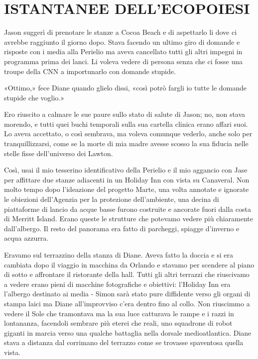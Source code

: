 \chapter{ISTANTANEE DELL'ECOPOIESI}\label{istantanee-dell-ecopoiesi}

\hfill\break

Jason suggerì di prenotare le stanze a Cocoa Beach e di aspettarlo li
dove ci avrebbe raggiunto il giorno dopo. Stava facendo un ultimo giro
di domande e risposte con i media alla Perielio ma aveva cancellato
tutti gli altri impegni in programma prima dei lanci. Li voleva vedere
di persona senza che ci fosse una troupe della CNN a importunarlo con
domande stupide.

«Ottimo,» fece Diane quando glielo dissi, «così potrò fargli io tutte le
domande stupide che voglio.»

Ero riuscito a calmare le sue paure sullo stato di salute di Jason; no,
non stava morendo, e tutti quei buchi temporali sulla sua cartella
clinica erano affari suoi. Lo aveva accettato, o così sembrava, ma
voleva comunque vederlo, anche solo per tranquillizzarsi, come se la
morte di mia madre avesse scosso la sua fiducia nelle stelle fisse
dell'universo dei Lawton.

Così, usai il mio tesserino identificativo della Perielio e il mio
aggancio con Jase per affittare due stanze adiacenti in un Holiday Inn
con vista su Canaveral. Non molto tempo dopo l'ideazione del progetto
Marte, una volta annotate e ignorate le obiezioni dell'Agenzia per la
protezione dell'ambiente, una decina di piattaforme di lancio da acque
basse furono costruite e ancorate fuori dalla costa di Merritt Island.
Erano queste le strutture che potevamo vedere più chiaramente
dall'albergo. Il resto del panorama era fatto di parcheggi, spiagge
d'inverno e acqua azzurra.

Eravamo sul terrazzino della stanza di Diane. Aveva fatto la doccia e si
era cambiata dopo il viaggio in macchina da Orlando e stavamo per
scendere al piano di sotto e affrontare il ristorante della hall. Tutti
gli altri terrazzi che riuscivamo a vedere erano pieni di macchine
fotografiche e obiettivi: l'Holiday Inn era l'albergo destinato ai media
- Simon sarà stato pure diffidente verso gli organi di stampa laici ma
Diane all'improvviso c'era dentro fino al collo. Non riuscimmo a vedere
il Sole che tramontava ma la sua luce catturava le rampe e i razzi in
lontananza, facendoli sembrare più eterei che reali, uno squadrone di
robot giganti in marcia verso una qualche battaglia nella dorsale
medioatlantica. Diane stava a distanza dal corrimano del terrazzo come
se trovasse spaventosa quella vista.

